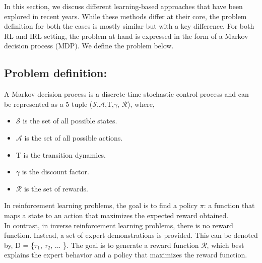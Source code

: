 \label{ch:3}
In this section, we discuss different learning-based approaches that have been explored in recent years.  While these methods differ at their core, the problem definition for both the cases is mostly similar but with a key difference. For both RL and IRL setting, the problem at hand is expressed in the form of a Markov decision process (MDP). We define the problem below.
\subsection*{Problem definition:}
A Markov decision process is a discrete-time stochastic control process and can be represented as a 5 tuple
($\mathcal{S}$,$\mathcal{A}$,T,$\gamma$, $\mathcal{R}$), where,
\begin{itemize}
    \item $\mathcal{S}$ is the set of all possible states.
    \item $\mathcal{A}$ is the set of all possible actions.
    \item T is the transition dynamics.
    \item $\gamma$ is the discount factor.
    \item $\mathcal{R}$ is the set of rewards.
\end{itemize}  
In reinforcement learning problems, the goal is to find a policy $\pi$: a function that maps a state to an action that maximizes the expected reward obtained.\\
In contrast, in inverse reinforcement learning problems, there is no reward function. Instead, a set of expert demonstrations is provided. This can be denoted by, D = \{$\tau_1$, $\tau_2$, ... \}. The goal is to generate a reward function $\mathcal{R}$, which best explains the expert behavior and a policy that maximizes the reward function.


